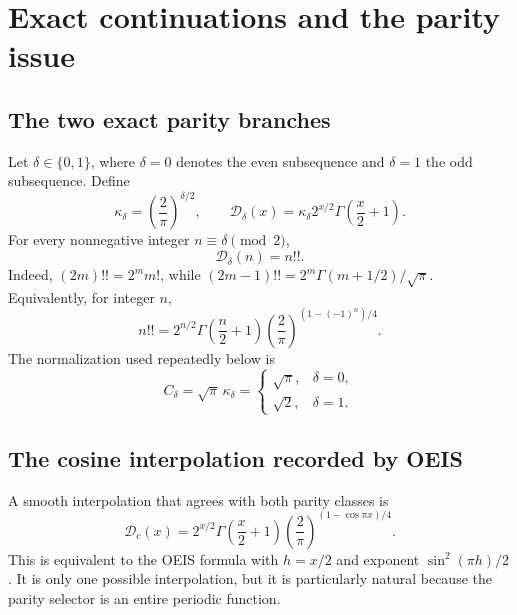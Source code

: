 \documentclass[11pt,oneside]{article}
\theoremstyle{plain}
\theoremstyle{definition}
\theoremstyle{remark}
\newcommand{\DF}{\mathcal D}
\newcommand{\Dc}{\mathcal D_{\!c}}
\begin{document}
\section{Exact continuations and the parity issue}
\label{sec:continuations}

\subsection{The two exact parity branches}

Let \(\delta\in\{0,1\}\), where \(\delta=0\) denotes the even subsequence and
\(\delta=1\) the odd subsequence.  Define
\begin{equation}
 \kappa_\delta=\left(\frac2\pi\right)^{\delta/2},
 \qquad
 \DF_\delta(x)=\kappa_\delta 2^{x/2}\Gamma\!\left(\frac x2+1\right).
 \label{eq:parity-branches}
\end{equation}
For every nonnegative integer \(n\equiv\delta\pmod2\),
\begin{equation}
 \DF_\delta(n)=n!!.
 \label{eq:branch-interpolation}
\end{equation}
Indeed, \((2m)!!=2^m m!\), while
\((2m-1)!!=2^m\Gamma(m+1/2)/\sqrt\pi\).  Equivalently, for integer \(n\),
\begin{equation}
 n!!=2^{n/2}\Gamma\!\left(\frac n2+1\right)
 \left(\frac2\pi\right)^{(1-(-1)^n)/4}.
 \label{eq:integer-unified-exact}
\end{equation}
The normalization used repeatedly below is
\begin{equation}
 C_\delta=\sqrt\pi\,\kappa_\delta
 =\begin{cases}\sqrt\pi,&\delta=0,\\[0.2em]\sqrt2,&\delta=1.\end{cases}
 \label{eq:Cdelta}
\end{equation}

\subsection{The cosine interpolation recorded by OEIS}

A smooth interpolation that agrees with both parity classes is
\begin{equation}
 \Dc(x)=2^{x/2}\Gamma\!\left(\frac x2+1\right)
 \left(\frac2\pi\right)^{(1-\cos\pi x)/4}.
 \label{eq:cosine-interpolation}
\end{equation}
This is equivalent to the OEIS formula with
\(h=x/2\) and exponent \(\sin^2(\pi h)/2\) \cite{OEIS}.  It is only one possible
interpolation, but it is particularly natural because the parity selector is
an entire periodic function.
\end{document}
